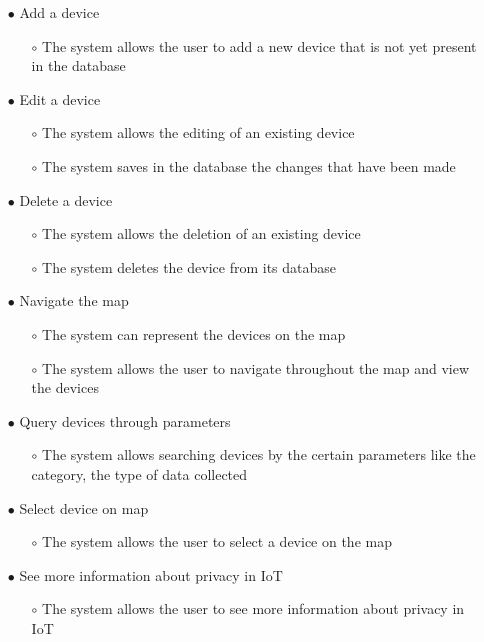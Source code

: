 \begin{itemize}
    \item[$\bullet$] Add a device
        \begin{itemize}
            \item[$\circ$] The system allows the user to add a new device that is not yet present in the database
        \end{itemize}
    \item[$\bullet$] Edit a device
    \begin{itemize}
        \item[$\circ$] The system allows the editing of an existing device
        \item[$\circ$] The system saves in the database the changes that have been made
    \end{itemize}
    \item[$\bullet$] Delete a device
    \begin{itemize}
        \item[$\circ$] The system allows the deletion of an existing device
        \item[$\circ$] The system deletes the device from its database
    \end{itemize}
    \item[$\bullet$] Navigate the map
    \begin{itemize}
        \item[$\circ$] The system can represent the devices on the map
        \item[$\circ$] The system allows the user to navigate throughout the map and view the devices
    \end{itemize}
    \item[$\bullet$] Query devices through parameters
    \begin{itemize}
        \item[$\circ$] The system allows searching devices by the certain parameters like the category, the type of data collected
    \end{itemize}
    \item[$\bullet$] Select device on map
    \begin{itemize}
        \item[$\circ$] The system allows the user to select a device on the map
    \end{itemize}
    \item[$\bullet$] See more information about privacy in IoT
    \begin{itemize}
        \item[$\circ$] The system allows the user to see more information about privacy in IoT

\end{itemize}
\end{itemize}
